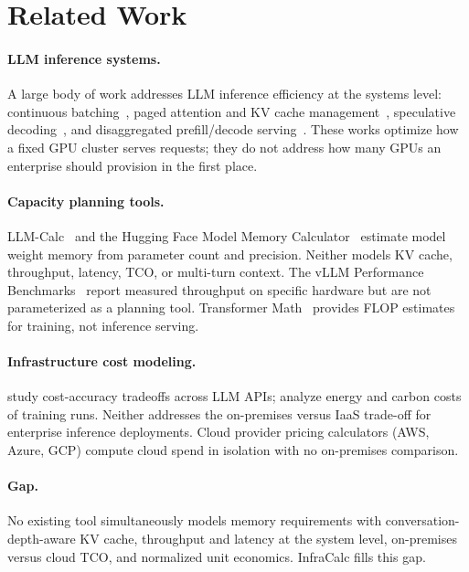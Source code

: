 \documentclass{article}
\begin{document}
\section{Related Work}
\label{sec:related}

\paragraph{LLM inference systems.}
A large body of work addresses LLM inference efficiency at the systems level:
continuous batching~\cite{yu2022orca}, paged attention and KV cache
management~\cite{kwon2023vllm}, speculative decoding~\cite{leviathan2023fast},
and disaggregated prefill/decode serving~\cite{zhong2024distserve}.
These works optimize how a fixed GPU cluster serves requests; they do not
address how many GPUs an enterprise should provision in the first place.

\paragraph{Capacity planning tools.}
LLM-Calc~\cite{llmcalc2023} and the Hugging Face Model Memory
Calculator~\cite{hfmemcalc} estimate model weight memory from parameter count
and precision. Neither models KV cache, throughput, latency, TCO, or
multi-turn context. The vLLM Performance Benchmarks~\cite{vllm2024bench}
report measured throughput on specific hardware but are not parameterized as
a planning tool. Transformer Math~\cite{eleutherai2022math} provides FLOP
estimates for training, not inference serving.

\paragraph{Infrastructure cost modeling.}
\citet{chen2023frugalgpt} study cost-accuracy tradeoffs across LLM APIs;
\citet{wu2022sustainable} analyze energy and carbon costs of training runs.
Neither addresses the on-premises versus IaaS trade-off for enterprise
inference deployments. Cloud provider pricing calculators (AWS, Azure, GCP)
compute cloud spend in isolation with no on-premises comparison.

\paragraph{Gap.}
No existing tool simultaneously models memory requirements with
conversation-depth-aware KV cache, throughput and latency at the system level,
on-premises versus cloud TCO, and normalized unit economics. InfraCalc fills
this gap.
\end{document}
